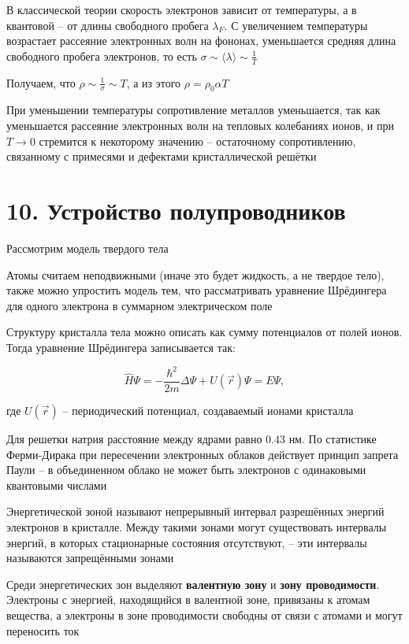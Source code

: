 \documentclass[12pt]{article}
\begin{document}
В классической теории скорость электронов зависит от температуры, а в квантовой -- от длины свободного пробега $\lambda_F$. С увеличением температуры возрастает рассеяние электронных волн на 
фононах, уменьшается средняя длина свободного пробега электронов, то есть $\sigma \sim \langle \lambda \rangle \sim \frac{1}{T}$

Получаем, что $\rho \sim \frac{1}{\sigma} \sim T$, а из этого $\rho = \rho_0 \alpha T$

При уменьшении температуры сопротивление металлов уменьшается, так как уменьшается рассеяние электронных волн на тепловых колебаниях ионов, и при $T \to 0$ стремится к некоторому значению -- остаточному сопротивлению, связанному с примесями и дефектами кристаллической решётки

\section{10. Устройство полупроводников}

Рассмотрим модель твердого тела

Атомы считаем неподвижными (иначе это будет жидкость, а не твердое тело), также можно упростить модель тем, что рассматривать уравнение Шрёдингера для одного электрона в суммарном электрическом поле

Структуру кристалла тела можно описать как сумму потенциалов от полей ионов. Тогда уравнение Шрёдингера записывается так:

\[
\hat H \Psi = -\frac{\hbar^2}{2m} \Delta \Psi + U(\vec r) \Psi = E \Psi,
\]

где $U(\vec r)$ -- периодический потенциал, создаваемый ионами кристалла

Для решетки натрия расстояние между ядрами равно $0.43$ нм. По статистике Ферми-Дирака при пересечении электронных облаков действует принцип запрета Паули -- в объединенном облако не может быть электронов с одинаковыми квантовыми числами

Энергетической зоной называют непрерывный интервал разрешённых энергий электронов в кристалле. Между такими зонами могут существовать интервалы энергий, в которых стационарные состояния отсутствуют, -- эти интервалы называются запрещёнными зонами

Среди энергетических зон выделяют \textbf{валентную зону} и \textbf{зону проводимости}. Электроны с энергией, находящийся в валентной зоне, привязаны к атомам вещества, а электроны в зоне проводимости свободны от связи с атомами и могут переносить ток
\end{document}
